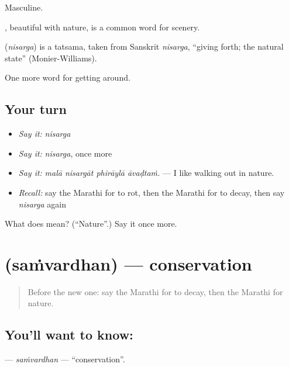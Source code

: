 Masculine.

, beautiful with nature, is a common word for scenery.

\begin{cousinweb}
\textbf{} (\emph{nisarga}) is a tatsama, taken from Sanskrit \emph{nisarga}, \textquotedblleft{}giving forth; the natural state\textquotedblright{} (Monier-Williams).
\end{cousinweb}

\begin{grammarlens}[title={What you've built}]
One more word for getting around.
\end{grammarlens}

\subsection*{Your turn}
\begin{itemize}
\raggedright
  \item \emph{Say it:} \emph{nisarga}
  \item \emph{Say it:} \emph{nisarga}, once more
  \item \emph{Say it:} \emph{malā nisargāt phirāylā āvaḍtaṁ.} — I like walking out in nature.
  \item \emph{Recall:} say the Marathi for to rot, then the Marathi for to decay, then say \emph{nisarga} again
\end{itemize}

\begin{tcolorbox}[breakable,colback=teal!4,colframe=teal!35!black,title={Before you move on}]
What does  mean? (\textquotedblleft{}Nature\textquotedblright{}.) Say it once more.
\end{tcolorbox}
\section[\texorpdfstring{\mr{संवर्धन} (saṁvardhan)}{संवर्धन (saṁvardhan)}]{ (saṁvardhan) — conservation}

\label{lesson:MR-C449-samvardhan}



\begin{quote}
Before the new one: say the Marathi for to decay, then the Marathi for nature.
\end{quote}

\subsection*{You'll want to know: }
\textbf{} — \emph{saṁvardhan} — \textquotedblleft{}conservation\textquotedblright{}.

